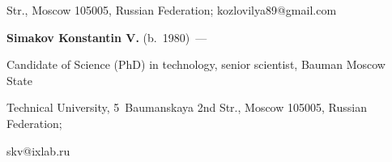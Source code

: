 Str., Moscow 105005, Russian Federation; \mbox{kozlovilya89@gmail.com}



\vspace*{3pt}



\noindent

\textbf{Simakov Konstantin V.} (b.\ 1980)~---

Candidate of Science (PhD) in technology, senior scientist, Bauman Moscow State

Technical University, 5~Baumanskaya 2nd Str., Moscow 105005, Russian Federation;

skv@ixlab.ru



 \label{end\stat}





\renewcommand{\bibname}{\protect\rm Литература}


